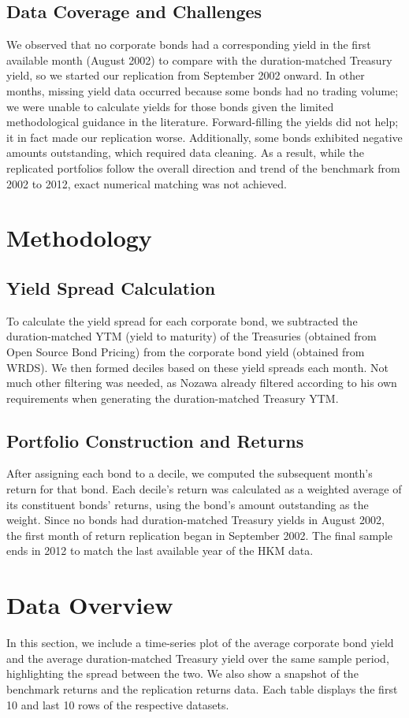 \documentclass[12pt]{article}
\begin{document}
\subsection{Data Coverage and Challenges}
We observed that no corporate bonds had a corresponding yield in the first available month (August 2002) to compare with the duration-matched Treasury yield, so we started our replication from September 2002 onward. In other months, missing yield data occurred because some bonds had no trading volume; we were unable to calculate yields for those bonds given the limited methodological guidance in the literature. Forward-filling the yields did not help; it in fact made our replication worse. Additionally, some bonds exhibited negative amounts outstanding, which required data cleaning. As a result, while the replicated portfolios follow the overall direction and trend of the benchmark from 2002 to 2012, exact numerical matching was not achieved.

\section{Methodology}
\subsection{Yield Spread Calculation}
To calculate the yield spread for each corporate bond, we subtracted the duration-matched YTM (yield to maturity) of the Treasuries (obtained from Open Source Bond Pricing) from the corporate bond yield (obtained from WRDS). We then formed deciles based on these yield spreads each month. Not much other filtering was needed, as Nozawa already filtered according to his own requirements when generating the duration-matched Treasury YTM.

\subsection{Portfolio Construction and Returns}
After assigning each bond to a decile, we computed the subsequent month’s return for that bond. Each decile’s return was calculated as a weighted average of its constituent bonds’ returns, using the bond’s amount outstanding as the weight. Since no bonds had duration-matched Treasury yields in August 2002, the first month of return replication began in September 2002. The final sample ends in 2012 to match the last available year of the HKM data.

\section{Data Overview}
In this section, we include a time-series plot of the average corporate bond yield and the average duration-matched Treasury yield over the same sample period, highlighting the spread between the two. We also show a snapshot of the benchmark returns and the replication returns data. Each table displays the first 10 and last 10 rows of the respective datasets. 
\end{document}
